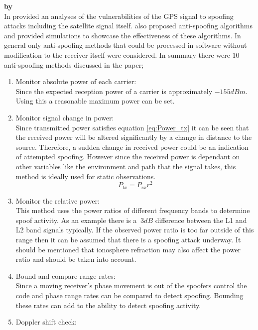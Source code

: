 \textbf{\emph{} by \citeauthor{RN11}} \\
In \citeyear{RN11} \citeauthor{RN11} \cite{RN11} provided an analyses of the vulnerabilities of the GPS signal to spoofing attacks including the
satellite signal itself. \citeauthor{RN11} also proposed anti-spoofing algorithms and provided simulations to showcase the effectiveness of these
algorithms. In general only anti-spoofing methods that could be processed in software without modification to the receiver itself were considered.
In summary there were 10 anti-spoofing methods discussed in the paper;  
\begin{enumerate}
    \item Monitor absolute power of each carrier: \\
    Since the expected reception power of a carrier is approximately $-155 dBm$. Using this a reasonable maximum power
    can be set.
    \item Monitor signal change in power: \\
    Since transmitted power satisfies equation \ref{eq:Power_tx} it can be seen that the received power will be altered significantly by a change in
    distance to the source. Therefore, a sudden change in received power could be an indication of attempted spoofing. However since the received power
    is dependant on other variables like the environment and path that the signal takes, this method is ideally used for static observations.
    \begin{equation} \label{eq:Power_tx}
        P_{tx}=P_{rx}r^2
    \end{equation}
    \item Monitor the relative power: \\
    This method uses the power ratios of different frequency bands to determine spoof activity. As an example there is a $~3dB$ difference between
    the L1 and L2 band signals typically. If the observed power ratio is too far outside of this range then it can be assumed that there is a spoofing
    attack underway. It should be mentioned that ionosphere refraction may also affect the power ratio and should be taken into account.
    \item Bound and compare range rates: \\ 
    Since a moving receiver's phase movement is out of the spoofers control the code and phase range rates can be compared to detect spoofing. 
    Bounding these rates can add to the ability to detect spoofing activity.
    \item Doppler shift check: \\

\end{enumerate}
